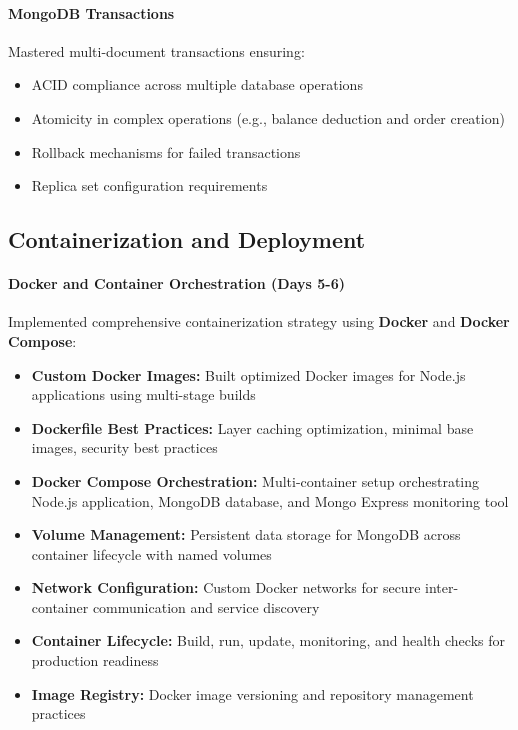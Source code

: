 \paragraph{MongoDB Transactions}

Mastered multi-document transactions ensuring:
\begin{itemize}
    \item ACID compliance across multiple database operations
    \item Atomicity in complex operations (e.g., balance deduction and order creation)
    \item Rollback mechanisms for failed transactions
    \item Replica set configuration requirements
\end{itemize}

\subsection{Containerization and Deployment}

\paragraph{Docker and Container Orchestration (Days 5-6)}

Implemented comprehensive containerization strategy using \textbf{Docker} and \textbf{Docker Compose}:
\begin{itemize}
    \item \textbf{Custom Docker Images:} Built optimized Docker images for Node.js applications using multi-stage builds
    \item \textbf{Dockerfile Best Practices:} Layer caching optimization, minimal base images, security best practices
    \item \textbf{Docker Compose Orchestration:} Multi-container setup orchestrating Node.js application, MongoDB database, and Mongo Express monitoring tool
    \item \textbf{Volume Management:} Persistent data storage for MongoDB across container lifecycle with named volumes
    \item \textbf{Network Configuration:} Custom Docker networks for secure inter-container communication and service discovery
    \item \textbf{Container Lifecycle:} Build, run, update, monitoring, and health checks for production readiness
    \item \textbf{Image Registry:} Docker image versioning and repository management practices
\end{itemize}

